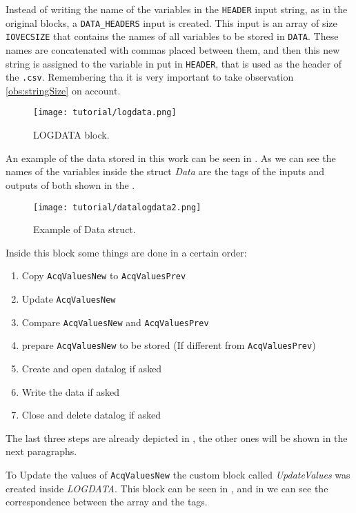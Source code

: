 Instead of writing the name of the variables in the \verb|HEADER| input string,
as in the original blocks, a \verb|DATA_HEADERS| input is created. This input is
an array of size \verb|IOVECSIZE| that contains the names of all variables to be
stored in \verb|DATA|. These names are concatenated with
commas placed between them, and then this new string is assigned to the variable
in put in \verb|HEADER|, that is used as the header of the \verb|.csv|.
Remembering tha it is
very important to take observation \ref{obs:stringSize} on account.

\begin{figure}[H] \centering
 \texttt{[image: tutorial/logdata.png]}
  \caption{LOGDATA block.}
  \label{fig:logdataBlock}
\end{figure}

An example of the data stored in this work can be seen in
. As we can see the names of the variables inside the
struct \emph{Data} are the tags of the inputs and outputs of both \PLCs{} shown
in the . 
\begin{figure}[H] \centering
 \texttt{[image: tutorial/datalogdata2.png]}
  \caption{Example of Data struct.}
  \label{fig:exampleDataStruct}
\end{figure}

Inside this block some things are done in a certain order:
\begin{enumerate}
\item Copy \verb|AcqValuesNew| to \verb|AcqValuesPrev|
\item Update \verb|AcqValuesNew|
\item Compare \verb|AcqValuesNew| and \verb|AcqValuesPrev| 
\item prepare \verb|AcqValuesNew| to be stored (If different from \verb|AcqValuesPrev|) 
\item Create and open datalog if asked
\item Write the data if asked
\item Close and delete datalog if asked
\end{enumerate}

The last three steps are already depicted in
, the other ones will be shown
in the next paragraphs.


To Update the values of \verb|AcqValuesNew| the custom block called
\emph{UpdateValues} was created inside \emph{LOGDATA}. This block can be seen in
, and in  we
can see the correspondence between the array and the tags.


